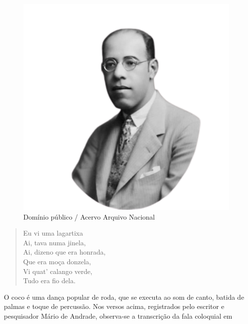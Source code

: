 \begin{myquote}

\begin{figure}[H]
\centering
\includegraphics[scale=0.25]{./imgSAEB_7_POR/media/image59.png}
\caption{Domínio público / Acervo Arquivo Nacional}
\end{figure}

\begin{verse}

Eu vi uma lagartixa \\
Ai, tava numa jinela, \\
Ai, dizeno que era honrada, \\
Que era moça donzela, \\
Vi quat' calango verde, \\
Tudo era fio dela. 

\end{verse}


\end{myquote}

O coco é uma dança popular de roda, que se executa ao som de canto, batida de palmas e 
toque de percussão. Nos versos acima, registrados pelo escritor e pesquisador Mário de 
Andrade, observa-se a transcrição da fala coloquial em

